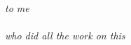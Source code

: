 \thispagestyle{plain}
\mbox{}
\vspace{2in}
\begin{center}
{\em to me \\ \ \\
who did all the work on this}
\end{center}

